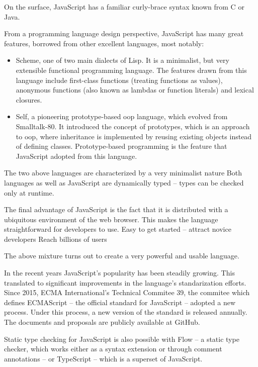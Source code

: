 On the surface, JavaScript has a familiar curly-brace syntax known from C or Java.

From a programming language design perspective, JavaScript has many great
features, borrowed from other excellent languages\cite[Section~4~Overview]{ecmascript}, most notably:
\begin{itemize}
   \item Scheme, one of two main dialects of Lisp\cite{r7rs}. It is a minimalist, but very extensible functional programming language. The features drawn from this language include first-class functions (treating functions as values), anonymous functions (also known as lambdas or function literals) and lexical closures.
   \item Self, a pioneering prototype-based \acrlong{oop} language\cite{self_handbook}, which evolved from Smalltalk-80\cite{smalltalk_history}. It introduced the concept of prototypes, which is an approach to \acrshort{oop}, where inheritance is implemented by reusing existing objects instead of defining classes. Prototype-based programming is the feature that JavaScript adopted from this language.
\end{itemize}
The two above languages are characterized by a very minimalist nature
Both languages as well as JavaScript\cite{js_types} are dynamically typed -- types can be checked only at runtime. 

The final advantage of JavaScript is the fact that it is distributed with a ubiquitous environment of the web browser. This makes the language straightforward for developers to use.
Easy to get started -- attract novice developers
Reach billions of users\cite{internet_stats}

The above mixture turns out to create a very powerful and usable language.


In the recent years JavaScript's popularity has been steadily growing\cite{js_growth}. This translated to significant improvements in the language's standarization efforts. Since 2015, ECMA International's\cite{ecma} Technical Commitee 39\cite{tc39}, the commitee which defines ECMAScript -- the official standard for JavaScript -- adopted a new process. Under this process, a new version of the standard is released annually\cite{ecmascript, ecmascript_2015, ecmascript_2017}. The documents and proposals are publicly available at GitHub\cite{ecma_github}.


Static type checking for JavaScript is also possible with Flow\cite{js_flow} -- a static type checker, which works either as a syntax extension or through comment annotations -- or TypeScript\cite{typescript} -- which is a superset of JavaScript.


